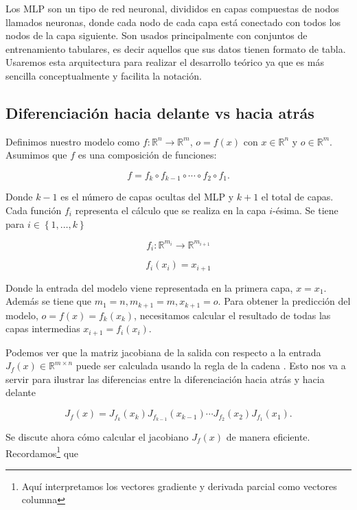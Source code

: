 Los MLP son un tipo de red neuronal, divididos en capas compuestas de nodos llamados neuronas, donde cada nodo de cada capa está conectado con todos los nodos de la capa siguiente. Son usados principalmente con conjuntos de entrenamiento tabulares, es decir aquellos que sus datos tienen formato de tabla. Usaremos esta arquitectura para realizar el desarrollo teórico ya que es más sencilla conceptualmente y facilita la notación. 

\subsection{Diferenciación hacia delante vs hacia atrás}


Definimos nuestro modelo como $f: \mathbb{R}^n \rightarrow \mathbb{R}^m$, $o=f(x)$ con $x \in \mathbb{R}^n$  y $o \in \mathbb{R}^m$. Asumimos que $f$ es una composición de funciones:

$$f=f_k \circ f_{k-1} \circ \cdots \circ f_2 \circ f_1.$$

Donde $k-1$ es el número de capas ocultas del MLP y $k+1$ el total de capas. Cada función $f_i$ representa el cálculo que se realiza en la capa $i$-ésima. Se tiene para $i \in \left \{ 1,\ldots,k \right \}$


$$f_i: \mathbb{R}^{m_i} \rightarrow \mathbb{R}^{m_{i+1}}$$

$$f_i(x_i)=x_{i+1}$$

Donde la entrada del modelo viene representada en la primera capa, $x=x_1$. Además se tiene que $m_1=n, m_{k+1}=m, x_{k+1}=o$. Para obtener la predicción del modelo, $o=f(x)=f_k(x_k)$, necesitamos calcular el resultado de todas las capas intermedias $x_{i+1}=f_i(x_i)$. 

Podemos ver que la matriz jacobiana de la salida con respecto a la entrada $J_f(x) \in  \mathbb{R}^{m\times n}$ puede ser calculada usando la regla de la cadena . Esto nos va a servir para ilustrar las diferencias entre la diferenciación hacia atrás y hacia delante


\begin{equation*}
	J_f(x) = J_{f_k}(x_k) J_{f_{k-1}}(x_{k-1}) \cdots J_{f_2}(x_2) J_{f_1}(x_1).
\end{equation*}



Se discute ahora cómo calcular el jacobiano $J_f(x)$ de manera eficiente. Recordamos\footnote{Aquí interpretamos los vectores gradiente y derivada parcial como vectores columna} que 

